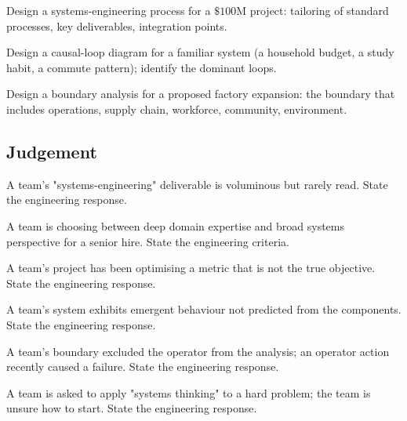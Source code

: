\begin{exercise}
Design a systems-engineering process for a $\$100\text{M}$ project: tailoring of standard processes, key deliverables, integration points.
\end{exercise}

\begin{exercise}
Design a causal-loop diagram for a familiar system (a household budget, a study habit, a commute pattern); identify the dominant loops.
\end{exercise}

\begin{exercise}
Design a boundary analysis for a proposed factory expansion: the boundary that includes operations, supply chain, workforce, community, environment.
\end{exercise}

\subsection*{Judgement}

\begin{exercise}
A team's "systems-engineering" deliverable is voluminous but rarely read. State the engineering response.
\end{exercise}

\begin{exercise}
A team is choosing between deep domain expertise and broad systems perspective for a senior hire. State the engineering criteria.
\end{exercise}

\begin{exercise}
A team's project has been optimising a metric that is not the true objective. State the engineering response.
\end{exercise}

\begin{exercise}
A team's system exhibits emergent behaviour not predicted from the components. State the engineering response.
\end{exercise}

\begin{exercise}
A team's boundary excluded the operator from the analysis; an operator action recently caused a failure. State the engineering response.
\end{exercise}

\begin{exercise}
A team is asked to apply "systems thinking" to a hard problem; the team is unsure how to start. State the engineering response.
\end{exercise}

